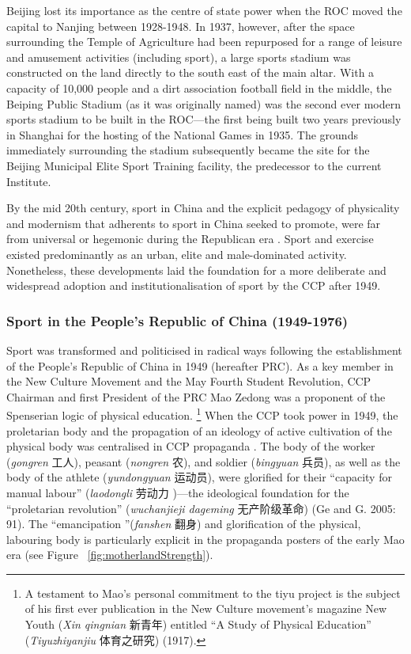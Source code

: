 \begin{CJK}{UTF8}{gbsn}
Beijing lost its importance as the centre of state power when the ROC moved the capital to Nanjing between 1928-1948.  In 1937, however, after the space surrounding the Temple of Agriculture had been repurposed for a range of leisure and amusement activities (including sport), a large sports stadium was constructed on the land directly to the south east of the main altar.  With a capacity of 10,000 people and a dirt association football field in the middle, the Beiping Public Stadium (as it was originally named) was the second ever modern sports stadium to be built in the ROC---the first being built two years previously in Shanghai for the hosting of the National Games in 1935.  The grounds immediately surrounding the stadium subsequently became the site for the Beijing Municipal Elite Sport Training facility, the predecessor to the current Institute.

By the mid 20th century, sport in China and the explicit pedagogy of physicality and modernism that adherents to sport in China seeked to promote, were far from universal or hegemonic during the Republican era \citep{Morris2004}. Sport and exercise existed predominantly as an urban, elite and male-dominated activity.  Nonetheless, these developments laid the foundation for a more deliberate and widespread adoption and institutionalisation of sport by the CCP after 1949.

\subsubsection{Sport in the People's Republic of China (1949-1976)\label{sect:sportPRC}}
Sport was transformed and politicised in radical ways following the establishment of the People’s Republic of China in 1949 (hereafter PRC).  As a key member in the New Culture Movement and the May Fourth Student Revolution, CCP Chairman and first President of the PRC Mao Zedong was a proponent of the Spenserian logic of physical education.
  \footnote{A testament to Mao’s personal commitment to the tiyu project is the subject of his first ever publication in the New Culture movement's magazine New Youth (\textit{Xin qingnian} 新青年) entitled ``A Study of Physical Education'' (\textit{Tiyuzhiyanjiu} 体育之研究) (1917).}
When the CCP took power in 1949, the proletarian body and the propagation of an ideology of active cultivation of the physical body was centralised in CCP propaganda \citep[58]{Brownell1995}.  The body of the worker (\textit{gongren} 工人), peasant (\textit{nongren} 农), and soldier (\textit{bingyuan} 兵员), as well as the body of the athlete (\textit{yundongyuan} 运动员), were glorified for their ``capacity for manual labour'' (\textit{laodongli} 劳动力 )---the ideological foundation for the ``proletarian revolution'' (\textit{wuchanjieji dageming} 无产阶级革命) (Ge and G. 2005: 91).  The ``emancipation ''(\textit{fanshen} 翻身) and glorification of the physical, labouring body is particularly explicit in the propaganda posters of the early Mao era \citep[87]{Ge2005} (see Figure ~\ref{fig:motherlandStrength}).


\end{CJK}
